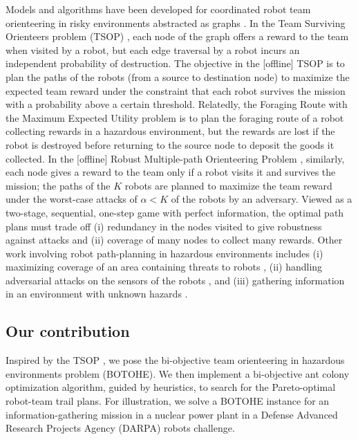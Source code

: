 \documentclass[11pt, oneside]{article}
\begin{document}
Models and algorithms have been developed for coordinated robot team orienteering in risky environments abstracted as graphs \cite{zhou2021multi}. 
In the Team Surviving Orienteers problem (TSOP) \cite{jorgensen2018team,jorgensen2017matroid,jorgensen2024matroid}, each node of the graph offers a reward to the team when visited by a robot, but each edge traversal by a robot incurs an independent probability of destruction. The objective in the [offline] TSOP is to plan the paths of the robots (from a source to destination node) to maximize the expected team reward under the constraint that each robot survives the mission with a probability above a certain threshold. 
Relatedly, the Foraging Route with the Maximum Expected Utility problem \cite{di2022foraging} is to plan the foraging route of a robot collecting rewards in a hazardous environment, but the rewards are lost if the robot is destroyed before returning to the source node to deposit the goods it collected.
In the [offline] Robust Multiple-path Orienteering Problem \cite{shi2023robust}, similarly, each node gives a reward to the team only if a robot visits it and survives the mission; the paths of the $K$ robots are planned to maximize the team reward under the worst-case attacks of $\alpha<K$ of the robots by an adversary. 
Viewed as a two-stage, sequential, one-step game with perfect information, the optimal path plans must trade off (i) redundancy in the nodes visited to give robustness against attacks and (ii) coverage of many nodes to collect many rewards.
Other work involving robot path-planning in hazardous environments includes 
(i) maximizing coverage of an area containing threats to robots \cite{korngut2023multi,yehoshua2016robotic}, 
(ii) handling adversarial attacks on the sensors of the robots \cite{liu2021distributed,zhou2022distributed,mayya2022adaptive,zhou2018resilient}, and 
(iii) gathering information in an environment with unknown hazards \cite{schwager2017multi}.

\subsection{Our contribution}
Inspired by the TSOP \cite{jorgensen2018team,jorgensen2017matroid,jorgensen2024matroid}, we pose the bi-objective team orienteering in hazardous environments problem (BOTOHE). 
We then implement a bi-objective ant colony optimization algorithm, guided by heuristics, to search for the Pareto-optimal robot-team trail plans.
For illustration, we solve a BOTOHE instance for an information-gathering mission in a nuclear power plant in a Defense Advanced Research Projects Agency (DARPA) robots challenge.
\end{document}

